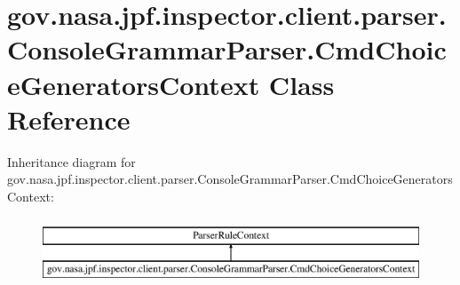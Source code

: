 \hypertarget{classgov_1_1nasa_1_1jpf_1_1inspector_1_1client_1_1parser_1_1_console_grammar_parser_1_1_cmd_choice_generators_context}{}\section{gov.\+nasa.\+jpf.\+inspector.\+client.\+parser.\+Console\+Grammar\+Parser.\+Cmd\+Choice\+Generators\+Context Class Reference}
\label{classgov_1_1nasa_1_1jpf_1_1inspector_1_1client_1_1parser_1_1_console_grammar_parser_1_1_cmd_choice_generators_context}
Inheritance diagram for gov.\+nasa.\+jpf.\+inspector.\+client.\+parser.\+Console\+Grammar\+Parser.\+Cmd\+Choice\+Generators\+Context\+:\begin{figure}[H]
\begin{center}
\leavevmode
\includegraphics[height=2.000000cm]{classgov_1_1nasa_1_1jpf_1_1inspector_1_1client_1_1parser_1_1_console_grammar_parser_1_1_cmd_choice_generators_context}
\end{center}
\end{figure}
